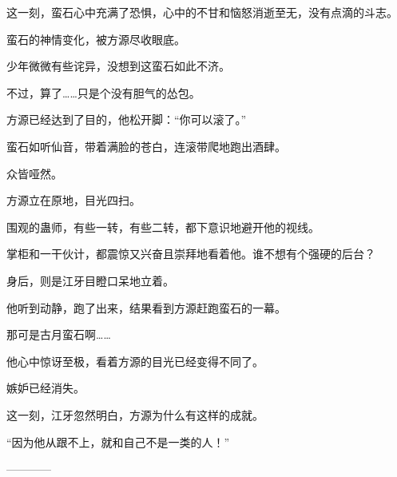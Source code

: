 \begin{this_body}
这一刻，蛮石心中充满了恐惧，心中的不甘和恼怒消逝至无，没有点滴的斗志。

蛮石的神情变化，被方源尽收眼底。

少年微微有些诧异，没想到这蛮石如此不济。

不过，算了……只是个没有胆气的怂包。

方源已经达到了目的，他松开脚：“你可以滚了。”

蛮石如听仙音，带着满脸的苍白，连滚带爬地跑出酒肆。

众皆哑然。

方源立在原地，目光四扫。

围观的蛊师，有些一转，有些二转，都下意识地避开他的视线。

掌柜和一干伙计，都震惊又兴奋且崇拜地看着他。谁不想有个强硬的后台？

身后，则是江牙目瞪口呆地立着。

他听到动静，跑了出来，结果看到方源赶跑蛮石的一幕。

那可是古月蛮石啊……

他心中惊讶至极，看着方源的目光已经变得不同了。

嫉妒已经消失。

这一刻，江牙忽然明白，方源为什么有这样的成就。

“因为他从跟不上，就和自己不是一类的人！”

------------

\end{this_body}


